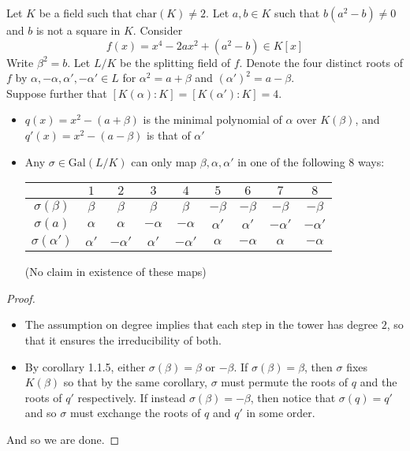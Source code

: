 \documentclass[a4paper]{article}
\begin{document}
\begin{lmm}{}{} Let $K$ be a field such that $\text{char}(K)\neq 2$. Let $a,b\in K$ such that $b(a^2-b)\neq 0$ and $b$ is not a square in $K$. Consider $$f(x)=x^4-2ax^2+(a^2-b)\in K[x]$$ Write $\beta^2=b$. Let $L/K$ be the splitting field of $f$. Denote the four distinct roots of $f$ by $\alpha,-\alpha,\alpha',-\alpha'\in L$ for $\alpha^2=a+\beta$ and $(\alpha')^2=a-\beta$. \\

Suppose further that $[K(\alpha):K]=[K(\alpha'):K]=4$. 
\begin{itemize}
\item $q(x)=x^2-(a+\beta)$ is the minimal polynomial of $\alpha$ over $K(\beta)$, and $q'(x)=x^2-(a-\beta)$ is that of $\alpha'$
\item Any $\sigma\in\text{Gal}(L/K)$ can only map $\beta,\alpha,\alpha'$ in one of the following $8$ ways: 
\begin{center}
\begin{tabular}{ c|cccccccc } 
& $1$ & $2$ & $3$ & $4$ & $5$ & $6$ & $7$ & $8$\\\hline
$\sigma(\beta)$ & $\beta$ & $\beta$ & $\beta$ & $\beta$ & $-\beta$ & $-\beta$ & $-\beta$ & $-\beta$ \\
$\sigma(a)$ & $\alpha$ & $\alpha$ & $-\alpha$ & $-\alpha$ & $\alpha'$ & $\alpha'$ & $-\alpha'$ & $-\alpha'$\\
$\sigma(\alpha')$ & $\alpha'$ & $-\alpha'$ & $\alpha'$ & $-\alpha'$ & $\alpha$ & $-\alpha$ & $\alpha$ & $-\alpha$
\end{tabular}
\end{center}
(No claim in existence of these maps)
\end{itemize} 
\begin{proof}~\\
\begin{itemize}
\item The assumption on degree implies that each step in the tower has degree $2$, so that it ensures the irreducibility of both. 
\item By corollary 1.1.5, either $\sigma(\beta)=\beta$ or $-\beta$. If $\sigma(\beta)=\beta$, then $\sigma$ fixes $K(\beta)$ so that by the same corollary, $\sigma$ must permute the roots of $q$ and the roots of $q'$ respectively. If instead $\sigma(\beta)=-\beta$, then notice that $\sigma(q)=q'$ and so $\sigma$ must exchange the roots of $q$ and $q'$ in some order. 
\end{itemize}
And so we are done. 
\end{proof}
\end{lmm}
\end{document}
